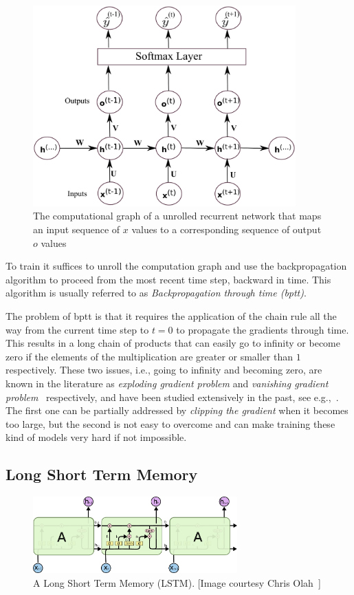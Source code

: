 \begin{figure}[t]
	\centering
	\includegraphics[width=0.9\textwidth]{figures/rnn_unrolling.eps}
	\caption{The computational graph of a unrolled recurrent network that maps an input sequence of $ x $ values to a corresponding sequence of output $ o $ values \label{fig:RNN_unrolling}}
\end{figure}

To train it suffices to unroll the computation graph and use the backpropagation algorithm to proceed from the most recent time step, backward in time. This algorithm is usually referred to as \emph{Backpropagation through time (\gls{bptt})}.

The problem of \gls{bptt} is that it requires the application of the chain rule all the way from the current time step to $t = 0$ to propagate the gradients through time.  This results in a long chain of products that can easily go to
infinity or become zero if the elements of the multiplication are greater or smaller than $1$ respectively. These two issues, i.e., going to infinity and becoming zero, are known in the literature as \emph{exploding gradient problem} and \emph{vanishing gradient problem}~\cite{Hochreiter_01} respectively, and have been studied extensively in the past, see e.g.,~\cite{Bengio_94}. The first one can be partially addressed by \emph{clipping the gradient} when it becomes too large, but the second is not easy to overcome and can make training these kind of models very hard if not impossible.



\subsection{Long Short Term Memory}
\begin{figure}[t]
	\centering
	\includegraphics[width=0.7\textwidth]{figures/LSTM.pdf}
	\caption{A Long Short Term Memory (LSTM). [Image courtesy Chris Olah~\cite{colah_15}]\label{fig:LSTM}}
\end{figure}

